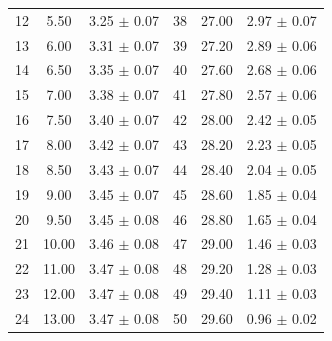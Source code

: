 \documentclass[a4paper]{article}
\begin{document}
\begin{table}[H]
\begin{tabular}{ccc||ccc}
		12 & 5.50                                       & 3.25 $\pm$ 0.07                 & 38 & 27.00                                      & 2.97 $\pm$ 0.07                 \\
		13 & 6.00                                       & 3.31 $\pm$ 0.07                 & 39 & 27.20                                      & 2.89 $\pm$ 0.06                 \\
		14 & 6.50                                       & 3.35 $\pm$ 0.07                 & 40 & 27.60                                      & 2.68 $\pm$ 0.06                 \\
		15 & 7.00                                       & 3.38 $\pm$ 0.07                 & 41 & 27.80                                      & 2.57 $\pm$ 0.06                 \\
		16 & 7.50                                       & 3.40 $\pm$ 0.07                 & 42 & 28.00                                      & 2.42 $\pm$ 0.05                 \\
		17 & 8.00                                       & 3.42 $\pm$ 0.07                 & 43 & 28.20                                      & 2.23 $\pm$ 0.05                 \\
		18 & 8.50                                       & 3.43 $\pm$ 0.07                 & 44 & 28.40                                      & 2.04 $\pm$ 0.05                 \\
		19 & 9.00                                       & 3.45 $\pm$ 0.07                 & 45 & 28.60                                      & 1.85 $\pm$ 0.04                 \\
		20 & 9.50                                       & 3.45 $\pm$ 0.08                 & 46 & 28.80                                      & 1.65 $\pm$ 0.04                 \\
		21 & 10.00                                      & 3.46 $\pm$ 0.08                 & 47 & 29.00                                      & 1.46 $\pm$ 0.03                 \\
		22 & 11.00                                      & 3.47 $\pm$ 0.08                 & 48 & 29.20                                      & 1.28 $\pm$ 0.03                 \\
		23 & 12.00                                      & 3.47 $\pm$ 0.08                 & 49 & 29.40                                      & 1.11 $\pm$ 0.03                 \\
		24 & 13.00                                      & 3.47 $\pm$ 0.08                 & 50 & 29.60                                      & 0.96 $\pm$ 0.02                 \\

\end{tabular}
\end{table}
\end{document}

